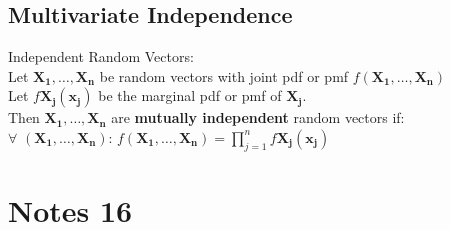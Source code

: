 \documentclass{article}
\begin{document}
\begin{flushleft}
\subsection*{Multivariate Independence}
Independent Random Vectors:\\
Let $\boldsymbol{X_1},\dots,\boldsymbol{X_n}$ be random vectors with joint pdf or pmf $f(\boldsymbol{X_1},\dots,\boldsymbol{X_n})$\\
Let $f\boldsymbol{X_j}(\boldsymbol{x_j})$ be the marginal pdf or pmf of $\boldsymbol{X_j}$.\\
Then $\boldsymbol{X_1},\dots,\boldsymbol{X_n}$ are \textbf{mutually independent} random vectors if:\\
$\forall$ $(\boldsymbol{X_1},\dots,\boldsymbol{X_n})$: \quad  $f(\boldsymbol{X_1},\dots,\boldsymbol{X_n})=\prod_{j=1}^{n}f\boldsymbol{X_j}(\boldsymbol{x_j})$
\section*{Notes 16}

\end{flushleft}
\end{document}
